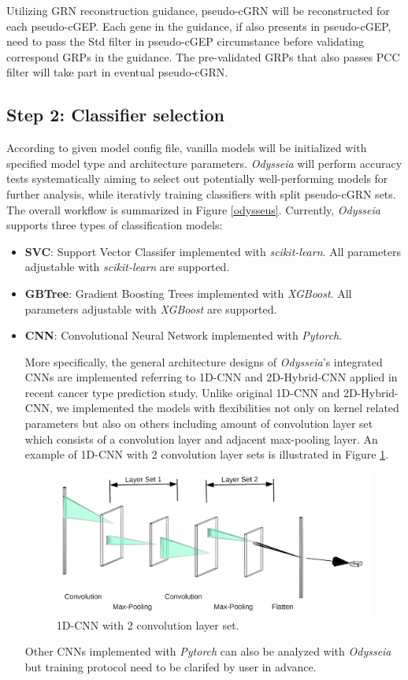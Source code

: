 \documentclass[fleqn,10pt]{wlscirep}
\begin{document}
Utilizing GRN reconstruction guidance, pseudo-cGRN will be reconstructed for each pseudo-cGEP.
Each gene in the guidance, if also presents in pseudo-cGEP, need to pass the Std filter in pseudo-cGEP circumstance before validating correspond GRPs in the guidance.
The pre-validated GRPs that also passes PCC filter will take part in eventual pseudo-cGRN.

\subsection*{Step 2: Classifier selection}
\label{step2}
According to given model config file, vanilla models will be initialized with specified model type and architecture parameters.
\emph{Odysseia} will perform accuracy tests systematically aiming to select out potentially well-performing models for further analysis, while iterativly training classifiers with split pseudo-cGRN sets.
The overall workflow is summarized in Figure \ref{odysseus}.
Currently, \emph{Odysseia} supports three types of classification models:
\begin{itemize}
\setlength\itemsep{0em}
\item \textbf{SVC}: Support Vector Classifer implemented with \emph{scikit-learn}.\cite{scikit-learn}
All parameters adjustable with \emph{scikit-learn}\cite{scikit-learn} are supported.
\item \textbf{GBTree}: Gradient Boosting Trees implemented with \emph{XGBoost}.\cite{chen2016xgboost}
All parameters adjustable with \emph{XGBoost}\cite{chen2016xgboost} are supported.
\item \textbf{CNN}: Convolutional Neural Network implemented with \emph{Pytorch}\cite{NEURIPS2019_9015}.

More specifically, the general architecture designs of \emph{Odysseia}'s integrated CNNs are implemented referring to 1D-CNN and 2D-Hybrid-CNN applied in recent cancer type prediction study\cite{mostavi_chiu_huang_chen_2020}.
Unlike original 1D-CNN and 2D-Hybrid-CNN, we implemented the models with flexibilities not only on kernel related parameters but also on others including amount of convolution layer set which consists of a convolution layer and adjacent max-pooling layer.
An example of 1D-CNN with 2 convolution layer sets is illustrated in Figure \ref{1dCNN}.
\begin{figure}[ht]
\centering
\includegraphics[width=0.8\linewidth]{image/nn.png}
\caption{1D-CNN with 2 convolution layer set.}
\label{1dCNN}
\end{figure}

Other CNNs implemented with \emph{Pytorch}\cite{NEURIPS2019_9015} can also be analyzed with \emph{Odysseia} but training protocol need to be clarifed by user in advance.
\end{itemize}
\end{document}
